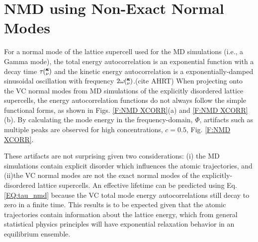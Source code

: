 \documentclass[aps,prb,onecolumn,preprint,footinbib,superscriptaddress,amsmath,amssymb,floatfix]{revtex4}
\newcommand{\kv}{\mspace{-4.0mu}\left(\mspace{-8.0mu}
\begin{smallmatrix}&\pmb{\kappa} \\&\nu\end{smallmatrix}
\mspace{-3.0mu}\right)}
\begin{document}

\section{\label{A:NMD XCORR}
NMD using Non-Exact Normal Modes}

For a normal mode of the lattice supercell 
used for the MD simulations (i.e., a Gamma mode), 
the total energy autocorrelation is an exponential function  
with a decay time $\tau\kv$ and the kinetic energy autocorrelation is a 
exponentially-damped sinusoidal oscillation with frequency 
$2\omega\kv$.(cite AHRT)   
When projecting onto the VC normal modes from MD simulations  
of the explicitly disordered lattice supercells, 
the energy autocorrelation functions 
do not always follow the simple functional forms, 
as shown in Figs. \ref{F:NMD XCORR}(a) and \ref{F:NMD XCORR}(b). 
By calculating the mode energy in the  
frequency-domain, $\Phi$,\cite{larkin_comparison_2012} artifacts such as 
multiple peaks are observed for high concentrations,  
$c=0.5$, Fig. \ref{F:NMD XCORR}.   

These artifacts are not surprising given two considerations: 
(i) the MD simulations 
contain explicit disorder which influences the atomic trajectories, 
and (ii)the VC normal modes are not the exact normal modes of the 
explicitly-disordered lattice supercells. 
An effective lifetime can be predicted 
using Eq. \eqref{EQ:tau_nmd} 
because the VC total mode energy autocorrelations 
still decay to zero in a finite time. This results is to be expected 
given that the atomic trajectories contain 
information about the lattice energy, which from general statistical 
physics principles will have exponential relaxation behavior in an 
equilibrium ensemble.
\cite{srivastava_physics_1990,landau_statistical_1980,
rajabpour_thermal_2010}
\end{document}
